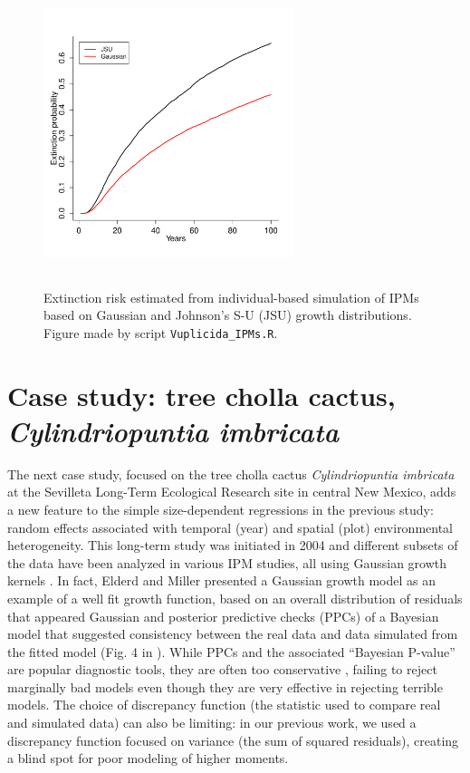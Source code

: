 \documentclass[12pt]{article}
\begin{document}
\begin{spacing}{1.9}
\begin{figure}[tbp]
	\centering
	\includegraphics[width=0.65\textwidth,height=3.5in]{figures/lichen_extinction_risk}
	\caption{Extinction risk estimated from individual-based simulation of IPMs based on Gaussian and Johnson's S-U (JSU) growth distributions. Figure made by script \texttt{Vuplicida\_IPMs.R}.}
	\label{fig:lichen_extinction}
\end{figure} 


\section{Case study: tree cholla cactus, \emph{Cylindriopuntia imbricata}}
\label{sec:cactusCaseStudy} 
The next case study, focused on the tree cholla cactus \emph{Cylindriopuntia imbricata} at the Sevilleta Long-Term Ecological Research site in central New Mexico, adds a new feature to the simple size-dependent regressions in the previous study: random effects associated with temporal (year) and spatial (plot) environmental heterogeneity. 
This long-term study was initiated in 2004 and different subsets of the data have been analyzed in various IPM studies, all using Gaussian growth kernels  \citep{miller2009impacts,czachurademographic,compagnoni2016effect,ohm2014balancing,elderd2016quantifying}.
In fact, Elderd and Miller \citeyear{elderd2016quantifying} presented a Gaussian growth model as an example of a well fit growth function, based on an overall distribution of residuals that appeared Gaussian and posterior predictive checks (PPCs) of a Bayesian model that suggested consistency between the real data and data simulated from the fitted model (Fig. 4 in \citep{elderd2016quantifying}). 
While PPCs and the associated ``Bayesian P-value'' are popular diagnostic tools, they are often too conservative \citep{conn2018guide,zhang2014comparative}, failing to reject marginally bad models even though they are very effective in rejecting terrible models.
The choice of discrepancy function (the statistic used to compare real and simulated data) can also be limiting: in our previous work, we used a discrepancy function focused on variance (the sum of squared residuals), creating a blind spot for poor modeling of higher moments.


\end{spacing}
\end{document}
